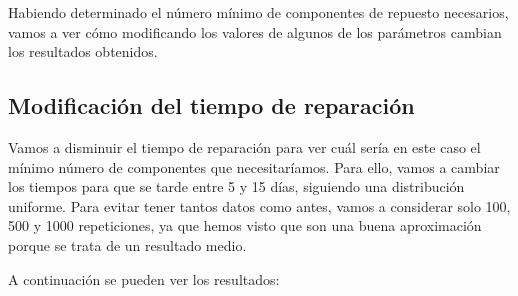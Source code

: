 \documentclass[11pt,a4paper]{report}
\begin{document}
Habiendo determinado el número mínimo de componentes de repuesto necesarios, vamos a ver cómo modificando los valores
de algunos de los parámetros cambian los resultados obtenidos.

\subsection{Modificación del tiempo de reparación}

Vamos a disminuir el tiempo de reparación para ver cuál sería en este caso el mínimo número de componentes que
necesitaríamos. Para ello, vamos a cambiar los tiempos para que se tarde entre 5 y 15 días, siguiendo una distribución
uniforme. Para evitar tener tantos datos como antes, vamos a considerar solo 100, 500 y 1000 repeticiones, ya que
hemos visto que son una buena aproximación porque se trata de un resultado medio.

A continuación se pueden ver los resultados:
\end{document}
